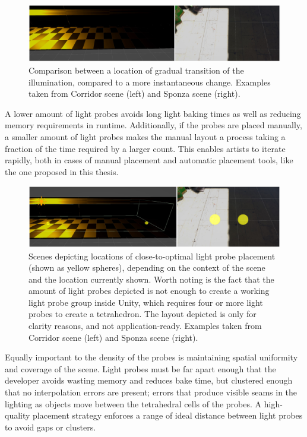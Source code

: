 \begin{figure}[h]
	\centering
	\includegraphics[width=\linewidth]{Graphics/results/concats/comparison7.png}
	\caption{Comparison between a location of gradual transition of the illumination, compared to a more instantaneous change. Examples taken from Corridor scene (left) and Sponza scene (right).}
	\label{fig:transition_comparison}
\end{figure}

A lower amount of light probes avoids long light baking times as well as reducing memory requirements in runtime. Additionally, if the probes are placed manually, a smaller amount of light probes makes the manual layout a process taking a fraction of the time required by a larger count. This enables artists to iterate rapidly, both in cases of manual placement and automatic placement tools, like the one proposed in this thesis.

\begin{figure}[h]
	\centering
	\includegraphics[width=\linewidth]{Graphics/results/concats/comparison8.png}
	\caption{Scenes depicting locations of close-to-optimal light probe placement (shown as yellow spheres), depending on the context of the scene and the location currently shown. Worth noting is the fact that the amount of light probes depicted is not enough to create a working light probe group inside Unity, which requires four or more light probes to create a tetrahedron. The layout depicted is only for clarity reasons, and not application-ready. Examples taken from Corridor scene (left) and Sponza scene (right).}
	\label{fig:transition_comparison_lp}
\end{figure}

Equally important to the density of the probes is maintaining spatial uniformity and coverage of the scene. Light probes must be far apart enough that the developer avoids wasting memory and reduces bake time, but clustered enough that no interpolation errors are present; errors that produce visible seams in the lighting as objects move between the tetrahedral cells of the probes. A high-quality placement strategy enforces a range of ideal distance between light probes to avoid gaps or clusters.

